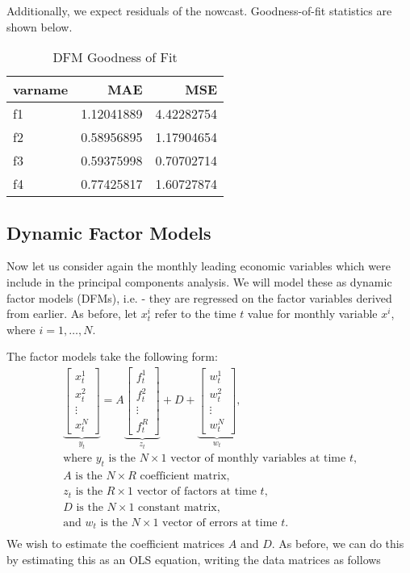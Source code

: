 \documentclass[11pt, letterpaper]{article}\usepackage[]{graphicx}\usepackage[]{color}
\begin{document}
Additionally, we expect residuals of the nowcast. Goodness-of-fit statistics are shown below.
\begin{table}[H]
\centering
\begingroup\footnotesize
\begin{tabular}{lrr}
  \hline
varname & MAE & MSE \\ 
  \hline
f1 & 1.12041889 & 4.42282754 \\ 
  f2 & 0.58956895 & 1.17904654 \\ 
  f3 & 0.59375998 & 0.70702714 \\ 
  f4 & 0.77425817 & 1.60727874 \\ 
   \hline
\end{tabular}
\endgroup
\caption{DFM Goodness of Fit} 
\end{table}




\subsection{Dynamic Factor Models}
Now let us consider again the monthly leading economic variables which were include in the principal components analysis. We will model these as dynamic factor models (DFMs), i.e. - they are regressed on the factor variables derived from earlier. As before, let $x^i_t$ refer to the time $t$ value for monthly variable $x^i$, where $i = 1, \dots, N$.

The factor models take the following form:
\begin{align*}
\underbrace{\begin{bmatrix}
	x^1_t\\
	x^2_t\\
	\vdots \\
	x^N_t
\end{bmatrix}}_{y_t}
=
A
\underbrace{\begin{bmatrix}
	f^1_{t}\\
	f^2_{t}\\
	\vdots \\
	f^R_{t}
\end{bmatrix}}_{z_t}
+
D 
+
\underbrace{\begin{bmatrix}
	w^1_t\\
	w^2_t\\
	\vdots\\
	w^N_t
\end{bmatrix}}_{w_t},\\
\text{where $y_t$ is the $N \times 1$ vector of monthly variables at time $t$,}\\
\text{$A$ is the $N \times R$ coefficient matrix,}\\
\text{$z_t$ is the $R \times 1$ vector of factors at time $t$,}\\
\text{$D$ is the $N \times 1$ constant matrix,}\\
\text{and $w_t$ is the $N \times 1$ vector of errors at time $t$.}\\
\end{align*}
We wish to estimate the coefficient matrices $A$ and $D$. As before, we can do this by estimating this as an OLS equation, writing the data matrices as follows
\end{document}
